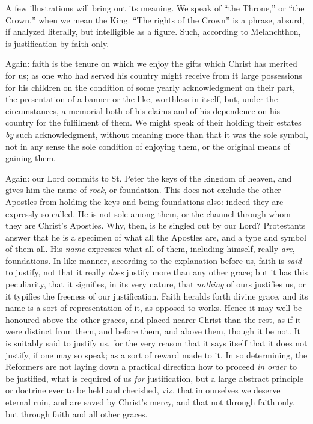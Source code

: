 A few illustrations will bring out its meaning. We speak of
``the Throne,'' or ``the Crown,'' when we mean the
King. ``The rights of the Crown'' is a phrase, absurd, if
analyzed literally, but intelligible as a figure. Such, according to
Melanchthon, is justification by faith only.

Again: faith is the tenure on which we enjoy the gifts which Christ
has merited for us; as one who had served his country might receive
from it large possessions for his children on the condition of some
yearly acknowledgment on their part, the presentation of a banner or
the like, worthless in itself, but, under the circumstances, a
memorial both of his claims and of his dependence on his country for
the fulfilment of them. We might speak of their holding their estates \emph{by}
such acknowledgment, without meaning more than that it was the sole
symbol, not in any sense the sole condition of enjoying them, or the
original means of gaining them.

Again: our Lord commits to St. Peter the keys of the kingdom of
heaven, and gives him the name of \emph{rock}, or foundation. This
does not exclude the other Apostles from holding the keys and
being foundations also: indeed they are expressly so called. He is not
sole among them, or the channel through whom they are Christ's
Apostles. Why, then, is he singled out by our Lord? Protestants answer
that he is a specimen of what all the Apostles are, and a type and
symbol of them all. His \emph{name} expresses what all of them,
including himself, really \emph{are},—foundations. In like manner,
according to the explanation before us, faith is \emph{said} to
justify, not that it really \emph{does} justify more than any other
grace; but it has this peculiarity, that it signifies, in its very
nature, that \emph{nothing} of ours justifies us, or it typifies the
freeness of our justification. Faith heralds forth divine grace, and
its name is a sort of representation of it, as opposed to works. Hence
it may well be honoured above the other graces, and placed nearer
Christ than the rest, as if it were distinct from them, and before
them, and above them, though it be not. It is suitably said to justify
us, for the very reason that it says itself that it does not justify,
if one may so speak; as a sort of reward made to it. In so
determining, the Reformers are not laying down a practical direction
how to proceed \emph{in order} to be justified, what is required of us
\emph{for} justification, but a large abstract principle or doctrine
ever to be held and cherished, viz. that in ourselves we deserve
eternal ruin, and are saved by Christ's mercy, and that not through
faith only, but through faith and all other graces.

